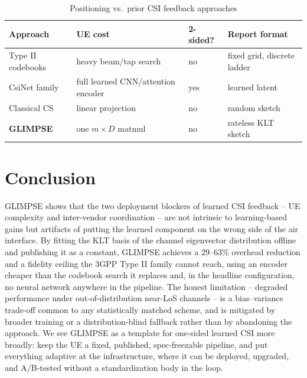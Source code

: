 \documentclass[conference]{IEEEtran}
\begin{document}
\begin{table}[t]
\centering
\caption{Positioning vs.\ prior CSI feedback approaches}
\label{tab:positioning}
\small
\begin{tabular}{@{}p{1.5cm}p{1.6cm}p{0.7cm}p{2.9cm}@{}}
\toprule
Approach & UE cost & 2-sided? & Report format \\
\midrule
Type II codebooks & heavy beam/tap search & no & fixed grid, discrete ladder \\
CsiNet family~\cite{wen2018csinet,guo2020csinetplus,lu2020crnet,cui2022transnet} & full learned CNN/attention encoder & yes & learned latent \\
Classical CS~\cite{kuo2012compressive,rao2014distributed} & linear projection & no & random sketch \\
\textbf{GLIMPSE} & one $m\!\times\!D$ matmul & no & rateless KLT sketch \\
\bottomrule
\end{tabular}
\end{table}

\section{Conclusion}
GLIMPSE shows that the two deployment blockers of learned CSI feedback -- UE complexity and inter-vendor coordination -- are not intrinsic to learning-based gains but artifacts of putting the learned component on the wrong side of the air interface. By fitting the KLT basis of the channel eigenvector distribution offline and publishing it as a constant, GLIMPSE achieves a 29--63\% overhead reduction and a fidelity ceiling the 3GPP Type II family cannot reach, using an encoder cheaper than the codebook search it replaces and, in the headline configuration, no neural network anywhere in the pipeline. The honest limitation -- degraded performance under out-of-distribution near-LoS channels -- is a bias--variance trade-off common to any statistically matched scheme, and is mitigated by broader training or a distribution-blind fallback rather than by abandoning the approach. We see GLIMPSE as a template for one-sided learned CSI more broadly: keep the UE a fixed, published, spec-freezable pipeline, and put everything adaptive at the infrastructure, where it can be deployed, upgraded, and A/B-tested without a standardization body in the loop.
\end{document}
